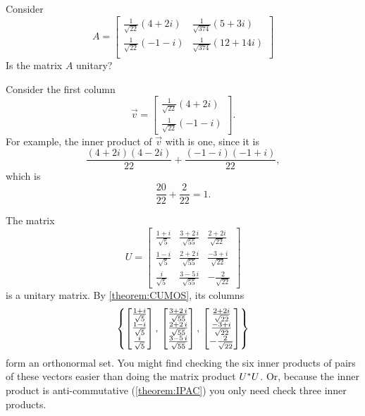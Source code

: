 \documentclass{ximera}
\begin{document}
\begin{question}
  Consider
  \[
    A=\begin{bmatrix}
      \frac{1}{\sqrt{22}}\left(4+2i\right) & \frac{1}{\sqrt{374}}\left(5+3i\right) \\
      \frac{1}{\sqrt{22}}\left(-1-i\right) & \frac{1}{\sqrt{374}}\left(12+14i\right) \\
    \end{bmatrix}
  \]
  Is the matrix $A$ unitary?

  \begin{multipleChoice}
  \end{multipleChoice}

  \begin{feedback}[correct]
    Consider the first column
    \[
      \vec{v} = \begin{bmatrix}\frac{1}{\sqrt{22}}\left(4+2i\right) \\
        \frac{1}{\sqrt{22}}\left(-1-i\right) 
    \end{bmatrix}.
    \]
    For example, the inner product of $\vec{v}$ with is one, since it is
    \[
      \frac{(4+2i)(4-2i)}{22} + \frac{(-1-i)(-1+i)}{22},
    \]
    which is
    \[
      \frac{20}{22} + \frac{2}{22} = 1.
    \]

  \end{feedback}
\end{question}

\begin{example}

  The matrix
  \[
    U=
    \begin{bmatrix}
      \frac{1 + i }{{\sqrt{5}}} &
      \frac{3 + 2\,i }{{\sqrt{55}}} &
      \frac{2+2i}{\sqrt{22}} \\
      \frac{1 - i }{{\sqrt{5}}} &
      \frac{2 + 2\,i }{{\sqrt{55}}} &
      \frac{-3 + i }{{\sqrt{22}}} \\
      \frac{i }{{\sqrt{5}}} &
      \frac{3 - 5\,i }{{\sqrt{55}}} &
      -\frac{2}{\sqrt{22}}
    \end{bmatrix}
  \]
  is a unitary matrix.  By \ref{theorem:CUMOS}, its columns
  \[
    \left\{
      \begin{bmatrix}
        \frac{1 + i }{{\sqrt{5}}}\\
        \frac{1 - i }{{\sqrt{5}}}\\
        \frac{i }{{\sqrt{5}}}
      \end{bmatrix},\,
      \begin{bmatrix}
        \frac{3 + 2\,i }{{\sqrt{55}}}\\
        \frac{2 + 2\,i }{{\sqrt{55}}}\\
        \frac{3 - 5\,i }{{\sqrt{55}}}
      \end{bmatrix},\,
      \begin{bmatrix}
        \frac{2+2i}{\sqrt{22}}\\
        \frac{-3 + i }{{\sqrt{22}}}\\
        -\frac{2}{\sqrt{22}}
      \end{bmatrix}
    \right\}
  \]
  form an orthonormal set.  You might find checking the six inner
  products of pairs of these vectors easier than doing the matrix
  product $U^\ast U$.  Or, because the inner product is
  anti-commutative (\ref{theorem:IPAC}) you only need check three
  inner products.
\end{example}
\end{document}
